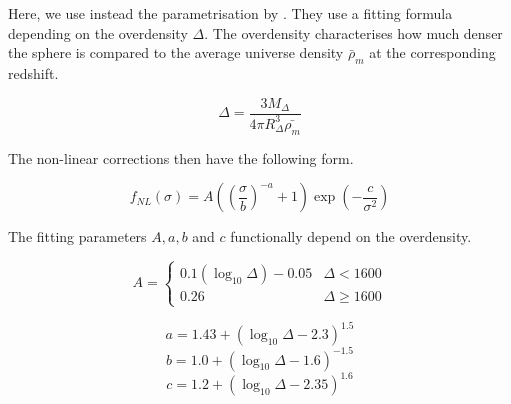 Here, we use instead the parametrisation by \cite{tinker_toward_2008}. They use a fitting formula depending on the overdensity $\Delta$. The overdensity characterises how much denser the sphere is compared to the average universe density $\bar{\rho}_m$ at the corresponding redshift.

\begin{equation}
    \Delta = \frac{3M_{\Delta}}{4\pi R^3_{\Delta}\bar{\rho_m}}
\end{equation}




The non-linear corrections then have the following form.

\begin{equation}
    f_{NL}(\sigma)=A \left( \left(\frac{\sigma}{b}\right)^{-a}+1\right)\exp(-\frac{c}{\sigma^2})
\end{equation}


The fitting parameters $A, a, b$ and $c$ functionally depend on the overdensity.

\[ A = \begin{cases}
    0.1(\log_{10}\Delta)-0.05 & \Delta<1600 \\
    0.26 & \Delta \geq 1600
\end{cases}
\]

\begin{equation}
    a=1.43+(\log_{10}\Delta -2.3)^{1.5}
\end{equation}
\begin{equation}
    b=1.0+(\log_{10}\Delta -1.6)^{-1.5}
\end{equation}
\begin{equation}
    c=1.2+(\log_{10}\Delta -2.35)^{1.6}
\end{equation}



